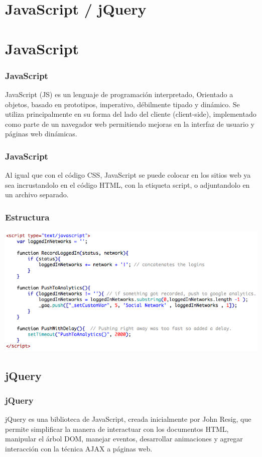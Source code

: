 \documentclass[12pt]{beamer}
\begin{document}
\section{JavaScript / jQuery}

\section{JavaScript}

\begin{frame}
 \frametitle{JavaScript}
 JavaScript (JS) es un lenguaje de programación interpretado, Orientado a objetos, basado en prototipos, imperativo, débilmente tipado y dinámico.
 \newline
 Se utiliza principalmente en su forma del lado del cliente (client-side), implementado como parte de un navegador web permitiendo mejoras en la interfaz de usuario y páginas web dinámicas.
\end{frame}

\begin{frame}
 \frametitle{JavaScript}
 Al igual que con el código CSS, JavaScript se puede colocar en los sitios web ya sea incrustandolo en el código HTML, con la etiqueta script, o adjuntandolo en un archivo separado.
\end{frame}

\begin{frame}
 \frametitle{Estructura}
 \begin{center}
    \includegraphics[scale=0.35]{img/js.png}
 \end{center}
\end{frame}


\subsection{jQuery}

\begin{frame}
 \frametitle{jQuery}
 jQuery es una biblioteca de JavaScript, creada inicialmente por John Resig, que permite simplificar la manera de interactuar con los documentos HTML, manipular el árbol DOM, manejar eventos, desarrollar animaciones y agregar interacción con la técnica AJAX a páginas web.
\end{frame}
\end{document}
